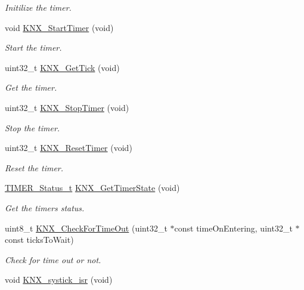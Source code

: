 \begin{DoxyCompactItemize}
\begin{DoxyCompactList}\small\item\em Initilize the timer. \end{DoxyCompactList}\item 
void \hyperlink{group___k_n_x___aux___exported___functions___group2_ga60ec3366b45d424dc5e5eabe1dbee506}{K\+N\+X\+\_\+\+Start\+Timer} (void)
\begin{DoxyCompactList}\small\item\em Start the timer. \end{DoxyCompactList}\item 
uint32\+\_\+t \hyperlink{group___k_n_x___aux___exported___functions___group2_ga51c9a1ad6a587a04465a0c26b685e571}{K\+N\+X\+\_\+\+Get\+Tick} (void)
\begin{DoxyCompactList}\small\item\em Get the timer. \end{DoxyCompactList}\item 
uint32\+\_\+t \hyperlink{group___k_n_x___aux___exported___functions___group2_ga44b5f88a0f2b0590924627b428107e97}{K\+N\+X\+\_\+\+Stop\+Timer} (void)
\begin{DoxyCompactList}\small\item\em Stop the timer. \end{DoxyCompactList}\item 
uint32\+\_\+t \hyperlink{group___k_n_x___aux___exported___functions___group2_ga4a1fd53320eeed9eb08d09ec720f3d42}{K\+N\+X\+\_\+\+Reset\+Timer} (void)
\begin{DoxyCompactList}\small\item\em Reset the timer. \end{DoxyCompactList}\item 
\hyperlink{group___k_n_x___aux___exported___types_ga6ed3d972c6c5995cb3fe41995f121b41}{T\+I\+M\+E\+R\+\_\+\+Status\+\_\+t} \hyperlink{group___k_n_x___aux___exported___functions___group2_ga34d3da57b9d1757a9724693c9e6bbe45}{K\+N\+X\+\_\+\+Get\+Timer\+State} (void)
\begin{DoxyCompactList}\small\item\em Get the timer\textquotesingle{}s status. \end{DoxyCompactList}\item 
uint8\+\_\+t \hyperlink{group___k_n_x___aux___exported___functions___group2_ga0b0455e3fb72a46c630878d1d68d0a6b}{K\+N\+X\+\_\+\+Check\+For\+Time\+Out} (uint32\+\_\+t $\ast$const time\+On\+Entering, uint32\+\_\+t $\ast$const ticks\+To\+Wait)
\begin{DoxyCompactList}\small\item\em Check for time out or not. \end{DoxyCompactList}\item 
void \hyperlink{group___k_n_x___aux___exported___functions___group2_gad9635bb60f2ba98f58874ef46e65c36d}{K\+N\+X\+\_\+systick\+\_\+isr} (void)\hypertarget{group___k_n_x___aux___exported___functions___group2_gad9635bb60f2ba98f58874ef46e65c36d}{}\label{group___k_n_x___aux___exported___functions___group2_gad9635bb60f2ba98f58874ef46e65c36d}


\end{DoxyCompactItemize}
